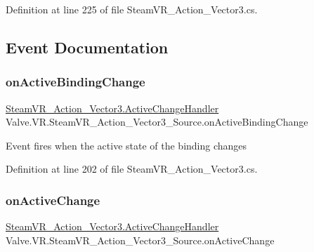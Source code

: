 Definition at line 225 of file Steam\+V\+R\+\_\+\+Action\+\_\+\+Vector3.\+cs.



\subsection{Event Documentation}
\mbox{\label{class_valve_1_1_v_r_1_1_steam_v_r___action___vector3___source_a38a15be5432581eb4f7715b3eef97736}} 
\subsubsection{\texorpdfstring{onActiveBindingChange}{onActiveBindingChange}}
{\footnotesize\ttfamily \mbox{\hyperlink{class_valve_1_1_v_r_1_1_steam_v_r___action___vector3_a47d6c1c558fb45841cd626df9ab3dcb9}{Steam\+V\+R\+\_\+\+Action\+\_\+\+Vector3.\+Active\+Change\+Handler}} Valve.\+V\+R.\+Steam\+V\+R\+\_\+\+Action\+\_\+\+Vector3\+\_\+\+Source.\+on\+Active\+Binding\+Change}



Event fires when the active state of the binding changes 



Definition at line 202 of file Steam\+V\+R\+\_\+\+Action\+\_\+\+Vector3.\+cs.

\mbox{\label{class_valve_1_1_v_r_1_1_steam_v_r___action___vector3___source_a72199c73773cc8a7f5a445ede6c4707e}} 
\subsubsection{\texorpdfstring{onActiveChange}{onActiveChange}}
{\footnotesize\ttfamily \mbox{\hyperlink{class_valve_1_1_v_r_1_1_steam_v_r___action___vector3_a47d6c1c558fb45841cd626df9ab3dcb9}{Steam\+V\+R\+\_\+\+Action\+\_\+\+Vector3.\+Active\+Change\+Handler}} Valve.\+V\+R.\+Steam\+V\+R\+\_\+\+Action\+\_\+\+Vector3\+\_\+\+Source.\+on\+Active\+Change}



